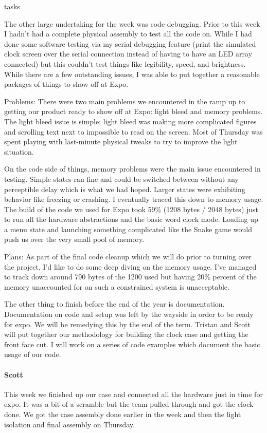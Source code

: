 tasks\documentclass[onecolumn, draftclsnofoot,10pt, compsoc]{IEEEtran}
\begin{document}
The other large undertaking for the week was code debugging. Prior to this week I hadn't had a complete physical assembly to test all the code on. While I had done some software testing via my serial debugging feature (print the simulated clock screen over the serial connection instead of having to have an LED array connected) but this couldn't test things like legibility, speed, and brightness. While there are a few outstanding issues, I was able to put together a reasonable packages of things to show off at Expo.

Problems: There were two main problems we encountered in the ramp up to getting our product ready to show off at Expo: light bleed and memory problems. The light bleed issue is simple: light bleed was making more complicated figures and scrolling text next to impossible to read on the screen. Most of Thursday was spent playing with last-minute physical tweaks to try to improve the light situation.

On the code side of things, memory problems were the main issue encountered in testing. Simple states ran fine and could be switched between without any perceptible delay which is what we had hoped. Larger states were exhibiting behavior like freezing or crashing. I eventually traced this down to memory usage. The build of the code we used for Expo took 59\% (1208 bytes / 2048 bytes) just to run all the hardware abstractions and the basic word clock mode. Loading up a menu state and launching something complicated like the Snake game would push us over the very small pool of memory.

Plans: As part of the final code cleanup which we will do prior to turning over the project, I'd like to do some deep diving on the memory usage. I've managed to track down around 790 bytes of the 1200 used but having 20\% percent of the memory unaccounted for on such a constrained system is unacceptable.

The other thing to finish before the end of the year is documentation. Documentation on code and setup was left by the wayside in order to be ready for expo. We will be remedying this by the end of the term. Tristan and Scott will put together our methodology for building the clock case and getting the front face cut. I will work on a series of code examples which document the basic usage of our code.
\paragraph{Scott}
This week we finished up our case and connected all the hardware just in time for expo. It was a bit of a scramble but the team pulled through and got the clock done. We got the case assembly done earlier in the week and then the light isolation and final assembly on Thursday.
\end{document}
